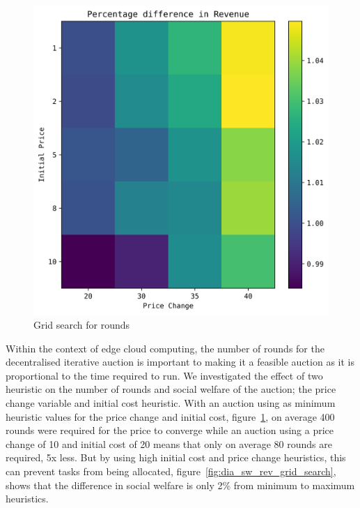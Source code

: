 \begin{figure}
    \centering
    \includegraphics[width=\linewidth]{figs/dia_heuristics/revenue_grid.png}
    \caption{Grid search for rounds}
    \label{fig:dia_rounds_grid_search}
\end{figure}

Within the context of edge cloud computing, the number of rounds for the decentralised iterative auction is important
to making it a feasible auction as it is proportional to the time required to run. We investigated the effect of two
heuristic on the number of rounds and social welfare of the auction; the price change variable and initial cost
heuristic. With an auction using as minimum heuristic values for the price change and initial cost,
figure~\ref{fig:dia_rounds_grid_search}, on average 400 rounds were required for the price to converge while an auction
using a price change of 10 and initial cost of 20 means that only on average 80 rounds are required, 5x less. But by
using high initial cost and price change heuristics, this can prevent tasks from being allocated,
figure~\ref{fig:dia_sw_rev_grid_search}, shows that the difference in social welfare is only 2\% from minimum to
maximum heuristics.

